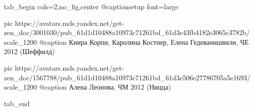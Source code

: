  
 
 
 
 


\ifcmt
  tab_begin cols=2,no_fig,center
		@captionsetup font=large

     pic https://avatars.mds.yandex.net/get-zen_doc/3001030/pub_61d1d10488a10973c71261bd_61d3e43fb4182e3065c3782b/scale_1200
		 @caption Киира Корпи, Каролина Костнер, Елена Гедеванишвили, ЧЕ 2012 (Шеффилд)

		 pic https://avatars.mds.yandex.net/get-zen_doc/1567788/pub_61d1d10488a10973c71261bd_61d3e506e27786705a5e1693/scale_1200
		 @caption Алена Леонова, ЧМ 2012 (Ницца)

  tab_end
\fi
